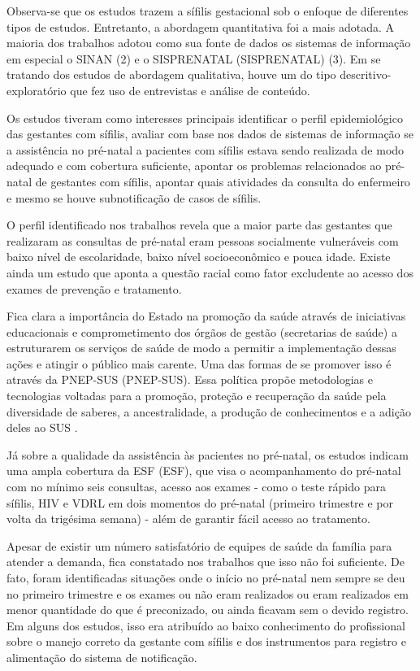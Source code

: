 Observa-se que os estudos trazem a sífilis gestacional sob o enfoque de diferentes tipos de estudos. Entretanto, a abordagem quantitativa foi a mais adotada. A maioria dos trabalhos adotou como sua fonte de dados os sistemas de informação em especial o \acrshort{SINAN} (2) e o \acrshort{SISPRENATAL} (\acrlong{SISPRENATAL}) (3). Em se tratando dos estudos de abordagem qualitativa, houve um do tipo descritivo-exploratório que fez uso de entrevistas e análise de conteúdo.

Os estudos tiveram como interesses principais identificar o perfil epidemiológico das gestantes com sífilis, avaliar com base nos dados de sistemas de informação se a assistência no pré-natal a pacientes com sífilis estava sendo realizada de modo adequado e com cobertura suficiente, apontar os problemas relacionados ao pré-natal de gestantes com sífilis, apontar quais atividades da consulta do enfermeiro e mesmo se houve subnotificação de casos de sífilis. 

O perfil identificado nos trabalhos revela que a maior parte das gestantes que realizaram as consultas de pré-natal eram pessoas socialmente vulneráveis com baixo nível de escolaridade, baixo nível socioeconômico e pouca idade. Existe ainda um estudo que aponta a questão racial como fator excludente ao acesso dos exames de prevenção e tratamento. \cite{dos2010assistencia,suto2016assistencia,tavares2012monitoramento,da2013sifilis}

Fica clara a importância do Estado na promoção da saúde através de iniciativas educacionais e comprometimento dos órgãos de gestão (secretarias de saúde) a estruturarem os serviços de saúde de modo a permitir a implementação dessas ações e atingir o público mais carente. Uma das formas de se promover isso é através da \acrlong{PNEP-SUS} (\acrshort{PNEP-SUS}). Essa política propõe metodologias e tecnologias voltadas para a promoção, proteção e recuperação da saúde pela diversidade de saberes, a ancestralidade, a produção de conhecimentos e a adição deles ao SUS \cite{vasconcelos1999educaccao}.

Já sobre a qualidade da assistência às pacientes no pré-natal, os estudos indicam uma ampla cobertura da \acrlong{ESF} (\acrshort{ESF}), que visa o acompanhamento do pré-natal com no mínimo seis consultas, acesso aos exames - como o teste rápido para sífilis, \acrshort{HIV} e \acrshort{VDRL} em dois momentos do pré-natal (primeiro trimestre e por volta da trigésima semana) - além de garantir fácil acesso ao tratamento.

Apesar de existir um número satisfatório de equipes de saúde da família para atender a demanda, fica constatado nos trabalhos que isso não foi suficiente. De fato, foram identificadas situações onde o início no pré-natal nem sempre se deu no primeiro trimestre e os exames ou não eram realizados ou eram realizados em menor quantidade do que é preconizado, ou ainda ficavam sem o devido registro. Em alguns dos estudos, isso era atribuído ao baixo conhecimento do profissional sobre o manejo correto da gestante com sífilis e dos instrumentos para registro e alimentação do sistema de notificação. \cite{tavares2012monitoramento,da2013sifilis,segatto2015evaluation}


